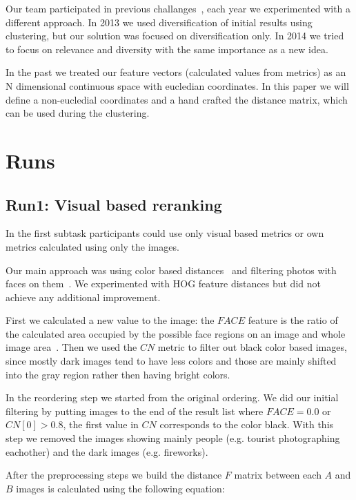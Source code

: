 \documentclass{sig-alternate}
\begin{document}
Our team participated in previous challanges~\cite{szHucs2013bmemtm,Paroczi2014}, each year we experimented with a different approach. In 2013 we used diversification of initial results using clustering, but our solution was focused on diversification only. In 2014 we tried to focus on relevance and diversity with the same importance as a new idea.

In the past we treated our feature vectors (calculated values from metrics) as an N dimensional continuous space with eucledian coordinates. In this paper we will define a non-eucledial coordinates and a hand crafted the distance matrix, which can be used during the clustering. 

\section{Runs}

\subsection{Run1: Visual based reranking}
In the first subtask participants could use only visual based metrics or own metrics calculated using only the images.

Our main approach was using color based distances~\cite{Datta2008,Paramita2010} and filtering photos with faces on them~\cite{szHucs2013bmemtm,Paroczi2014}. We experimented with HOG feature distances but did not achieve any additional improvement.

First we calculated a new value to the image: the $FACE$ feature is the ratio of the calculated area occupied by the possible face regions on an image and whole
image area~\cite{szHucs2013bmemtm}. Then we used the $CN$ metric to filter out black color based images, since mostly dark images tend to have less colors and those are mainly shifted into the gray region rather then having bright colors.

In the reordering step we started from the original ordering. We did our initial filtering by putting images to the end of the result list where $FACE=0.0$ or $CN[0]>0.8$, the first value in $CN$ corresponds to the color black. With this step we removed the images showing mainly people (e.g. tourist photographing eachother) and the dark images (e.g. fireworks). 

After the preprocessing steps we build the distance $F$ matrix between each $A$ and $B$ images is calculated using the following equation:
\end{document}
